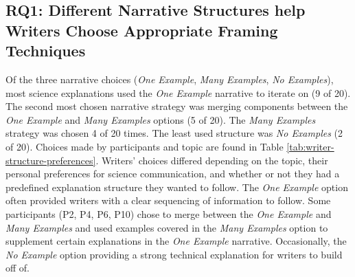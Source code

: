 \subsection{\textbf{RQ1}: Different Narrative Structures help Writers Choose Appropriate Framing Techniques}

Of the three narrative choices (\textit{One Example}, \textit{Many Examples}, \textit{No Examples}), most science explanations used the \textit{One Example} narrative to iterate on (9 of 20). The second most chosen narrative strategy was merging components between the \textit{One Example} and \textit{Many Examples} options (5 of 20). The \textit{Many Examples} strategy was chosen 4 of 20 times. The least used structure was \textit{No Examples} (2 of 20). Choices made by participants and topic are found in Table \ref{tab:writer-structure-preferences}. Writers' choices differed depending on the topic, their personal preferences for science communication, and whether or not they had a predefined explanation structure they wanted to follow. The \textit{One Example} option often provided writers with a clear sequencing of information to follow. Some participants (P2, P4, P6, P10) chose to merge between the \textit{One Example} and \textit{Many Examples} and used examples covered in the \textit{Many Examples} option to supplement certain explanations in the \textit{One Example} narrative. Occasionally, the \textit{No Example} option providing a strong technical explanation for writers to build off of.






